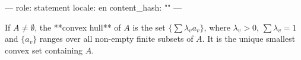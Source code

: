---
role: statement
locale: en
content_hash: ""
---

If $A \neq \emptyset$, the **convex hull** of $A$ is the set $\{\sum \lambda_v a_v\}$, where $\lambda_v > 0$, $\sum \lambda_v = 1$ and $\{a_v\}$ ranges over all non-empty finite subsets of $A$. It is the unique smallest convex set containing $A$.
